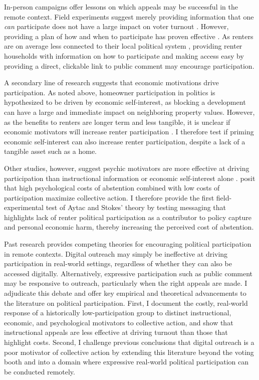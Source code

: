 \documentclass[12pt,final,fleqn]{article}
\theoremstyle{plain}
\begin{document}
In-person campaigns offer lessons on which appeals may be successful in the remote context. Field experiments suggest merely providing information that one \textit{can} participate does not have a large impact on voter turnout \citep{green2019get}. However, providing a plan of how and when to participate has proven effective \citep{nickerson2010you, milkman2011using}. As renters are on average less connected to their local political system \citep{mccabe2016no, ansolabehere2012movers}, providing renter households with information on how to participate and making access easy by providing a direct, clickable link to public comment may encourage participation. 

A secondary line of research suggests that economic motivations drive participation. As noted above, homeowner participation in politics is hypothesized to be driven by economic self-interest, as blocking a development can have a large and immediate impact on neighboring property values. However, as the benefits to renters are longer term and less tangible, it is unclear if economic motivators will increase renter participation \citep{citrin1990american, sears1991role}. I therefore test if priming economic self-interest can also increase renter participation, despite a lack of a tangible asset such as a home. 

Other studies, however, suggest psychic motivators are more effective at driving participation than instructional information or economic self-interest alone \citep{sears1991role, citrin1997public, ostrom2000collective, de2009field}. \citet{aytacc2019bother} posit that high psychological costs of abstention combined with low costs of participation maximize collective action. I therefore provide the first field-experimental test of Aytac and Stokes’ theory by testing messaging that highlights lack of renter political participation as a contributor to policy capture and personal economic harm, thereby increasing the perceived cost of abstention. 

Past research provides competing theories for encouraging political participation in remote contexts. Digital outreach may simply be ineffective at driving participation in real-world settings, regardless of whether they can also be accessed digitally.  Alternatively, expressive participation such as public comment may be responsive to outreach, particularly when the right appeals are made. I adjudicate this debate and offer key empirical and theoretical advancements to the literature on political participation. First, I document the costly, real-world response of a historically low-participation group to distinct instructional, economic, and psychological motivators to collective action, and show that instructional appeals are less effective at driving turnout than those that highlight costs. Second, I challenge previous conclusions that digital outreach is a poor motivator of collective action by extending this literature beyond the voting booth and into a domain where expressive real-world political participation can be conducted remotely.
\end{document}
